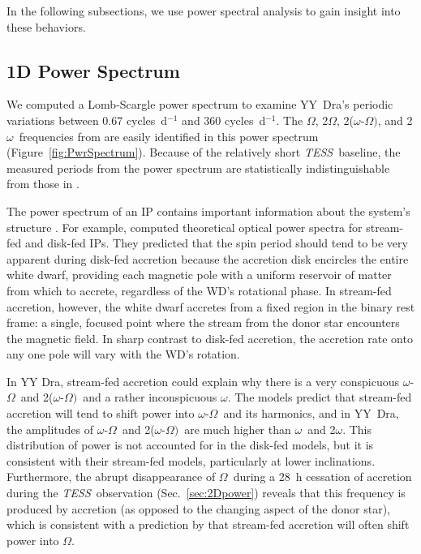 \documentclass[twocolumn]{aastex63}
\newcommand{\orbit}{$\Omega$}
\newcommand{\spin}{$\omega$}
\newcommand{\beat}{$\omega$-$\Omega$}
\newcommand{\doubleorbit}{2$\Omega$}
\newcommand{\doublespin}{2$\omega$}
\newcommand{\doublebeat}{2($\omega$-$\Omega)$}
\newcommand{\TESS}{\textit{TESS}}
\begin{document}
In the following subsections, we use power spectral analysis to gain insight into these behaviors. 

\subsection{1D Power Spectrum}
\label{sec:1Dpower}


We computed a Lomb-Scargle power spectrum \citep{LOMB,SCARGLE} to examine YY~Dra's periodic variations between 0.67 cycles~d$^{-1}$ and 360 cycles~d$^{-1}$. The \orbit, \doubleorbit, \doublebeat, and \doublespin\ frequencies from \citet{haswell} are easily identified in this power spectrum (Figure~\ref{fig:PwrSpectrum}). Because of the relatively short \TESS\ baseline, the measured periods from the power spectrum are statistically indistinguishable from those in \citet{haswell}.

The power spectrum of an IP contains important information about the system's structure  \citep{warner86, Ferrario99, murray}. For example, \citet{Ferrario99} computed theoretical optical power spectra for stream-fed and disk-fed IPs. They predicted that the spin period should tend to be very apparent during disk-fed accretion because the accretion disk encircles the entire white dwarf, providing each magnetic pole with a uniform reservoir of matter from which to accrete, regardless of the WD's rotational phase. In stream-fed accretion, however, the white dwarf accretes from a fixed region in the binary rest frame: a single, focused point where the stream from the donor star encounters the magnetic field. In sharp contrast to disk-fed accretion, the accretion rate onto any one pole will vary with the WD's rotation. 

In YY Dra, stream-fed accretion could explain why there is a very conspicuous \beat\ and \doublebeat\ and a rather inconspicuous \spin. The \citet{Ferrario99} models predict that stream-fed accretion will tend to shift power into \beat\ and its harmonics, and in YY~Dra, the amplitudes of \beat\ and \doublebeat\ are much higher than \spin\ and \doublespin. This distribution of power is not accounted for in the \citet{Ferrario99} disk-fed models, but it is consistent with their stream-fed models, particularly at lower inclinations. Furthermore, the abrupt disappearance of \orbit\ during a 28~h cessation of accretion during the \TESS\ observation (Sec.~\ref{sec:2Dpower}) reveals that this frequency is produced by accretion (as opposed to the changing aspect of the donor star), which is consistent with a prediction by \citet{Ferrario99} that stream-fed accretion will often shift power into \orbit.
\end{document}
